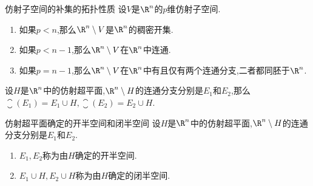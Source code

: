 \begin{proposition}{仿射子空间的补集的拓扑性质}{}
	设$V$是$\R^{n}$的$p$维仿射子空间.
	\begin{enumerate}
		\item 如果$p<n$,那么$\R^{n}\setminus V$是$\R^{n}$的稠密开集.
		\item 如果$p<n-1$,那么$\R^{n}\setminus V$在$\R^{n}$中连通.
		\item 如果$p=n-1$,那么$\R^{n}\setminus V$在$\R^{n}$中有且仅有两个连通分支,二者都同胚于$\R^{n}$.
	\end{enumerate}
\end{proposition}

\begin{proposition}{}{}
	设$H$是$\R^{n}$中的仿射超平面,$\R^{n}\setminus H$的连通分支分别是$E_{1}$和$E_{2}$,那么$\closure\left(E_{1}\right)=E_{1}\cup H,\closure\left(E_{2}\right)=E_{2}\cup H$.
\end{proposition}

\begin{definition}{仿射超平面确定的开半空间和闭半空间}{}
	设$H$是$\R^{n}$中的仿射超平面,$\R^{n}\setminus H$的连通分支分别是$E_{1}$和$E_{2}$.
	\begin{enumerate}
		\item $E_{1},E_{2}$称为由$H$确定的开半空间.
		\item $E_{1}\cup H,E_{2}\cup H$称为由$H$确定的闭半空间.
	\end{enumerate}
\end{definition}